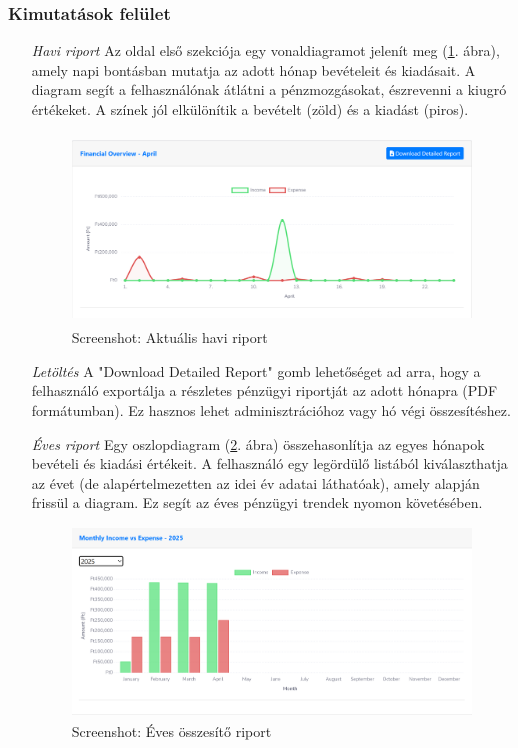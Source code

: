 \subsubsection{Kimutatások felület}
\begin{itemize}
	\item[\emph{Havi riport}] Az oldal első szekciója egy vonaldiagramot jelenít meg (\ref{fig:report1}. ábra), amely napi bontásban mutatja az adott hónap bevételeit és kiadásait. A diagram segít a felhasználónak átlátni a pénzmozgásokat, észrevenni a kiugró értékeket. A színek jól elkülönítik a bevételt (zöld) és a kiadást (piros).
	\begin{figure}[H]
		\centering
		\includegraphics[height=190px]{img/reports1}
		\caption{Screenshot: Aktuális havi riport}
		\label{fig:report1}
	\end{figure}
	\item[\emph{Letöltés}] A "Download Detailed Report" gomb lehetőséget ad arra, hogy a felhasználó exportálja a részletes pénzügyi riportját az adott hónapra (PDF formátumban). Ez hasznos lehet adminisztrációhoz vagy hó végi összesítéshez.
	\item[\emph{Éves riport}] Egy oszlopdiagram (\ref{fig:report2}. ábra) összehasonlítja az egyes hónapok bevételi és kiadási értékeit. A felhasználó egy legördülő listából kiválaszthatja az évet (de alapértelmezetten az idei év adatai láthatóak), amely alapján frissül a diagram. Ez segít az éves pénzügyi trendek nyomon követésében.
	\begin{figure}[H]
		\centering
		\includegraphics[height=190px]{img/reports2}
		\caption{Screenshot: Éves összesítő riport}
		\label{fig:report2}
	\end{figure}
\end{itemize}

